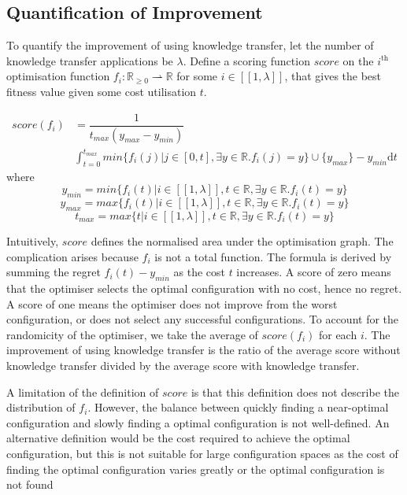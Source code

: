 \documentclass[10pt,a4paper]{article}
\newcommand{\dsb}[1]{[\![#1]\!]}
\begin{document}
\subsection{Quantification of Improvement}

To quantify the improvement of using knowledge transfer, let the number of knowledge transfer applications be $\lambda$. Define a scoring function $score$ on the $i^{\text{th}}$ optimisation function $f_i:\mathbb{R}_{\ge 0}\rightharpoonup\mathbb{R}$ for some $i\in\dsb{1,\lambda}$, that gives the best fitness value given some cost utilisation $t$.

\[
	\begin{split}
		score(f_i)&=\dfrac{1}{t_{max}(y_{max}-y_{min})}\\
		&\int_{t=0}^{t_{max}}min\{f_i(j)|j\in[0,t],\exists y\in\mathbb{R}.f_i(j)=y\}\cup\{y_{max}\}-y_{min}\mathrm{d}t
	\end{split}
\]where
\[y_{min}=min\{f_i(t)|i\in\dsb{1,\lambda},t\in\mathbb{R},\exists y\in\mathbb{R}.f_i(t)=y\}\]
\[y_{max}=max\{f_i(t)|i\in\dsb{1,\lambda},t\in\mathbb{R},\exists y\in\mathbb{R}.f_i(t)=y\}\]
\[t_{max}=max\{t|i\in\dsb{1,\lambda},t\in\mathbb{R},\exists y\in\mathbb{R}.f_i(t)=y\}\]

Intuitively, $score$ defines the normalised area under the optimisation graph. The complication arises because $f_i$ is not a total function. The formula is derived by summing the regret $f_i(t)-y_{min}$ as the cost $t$ increases. A score of zero means that the optimiser selects the optimal configuration with no cost, hence no regret. A score of one means the optimiser does not improve from the worst configuration, or does not select any successful configurations. To account for the randomicity of the optimiser, we take the average of $score(f_i)$ for each $i$. The improvement of using knowledge transfer is the ratio of the average score without knowledge transfer divided by the average score with knowledge transfer.

A limitation of the definition of $score$ is that this definition does not describe the distribution of $f_i$. However, the balance between quickly finding a near-optimal configuration and slowly finding a optimal configuration is not well-defined. An alternative definition would be the cost required to achieve the optimal configuration, but this is not suitable for large configuration spaces as the cost of finding the optimal configuration varies greatly or the optimal configuration is not found
\end{document}
